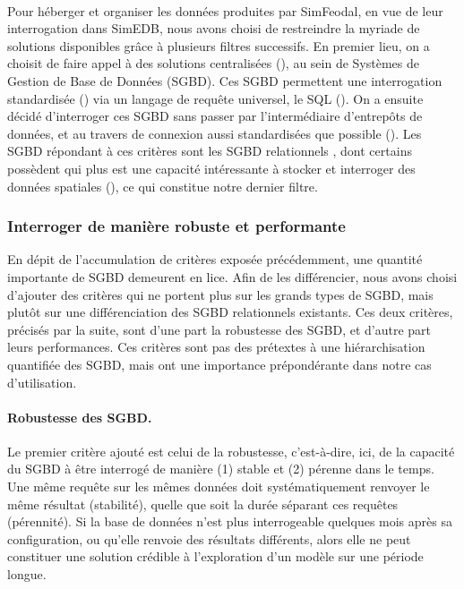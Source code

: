 \paragraph[Conclusion intermédiaire]{}

Pour héberger et organiser les données produites par SimFeodal, en vue de leur interrogation dans SimEDB, nous avons choisi de restreindre la myriade de solutions disponibles grâce à plusieurs filtres successifs.
En premier lieu, on a choisit de faire appel à des solutions centralisées (), au sein de Systèmes de Gestion de Base de Données (SGBD).
Ces SGBD permettent une interrogation standardisée () via un langage de requête universel, le SQL ().
On a ensuite décidé d'interroger ces SGBD sans passer par l'intermédiaire d'entrepôts de données, et au travers de connexion aussi standardisées que possible ().
Les SGBD répondant à ces critères sont les SGBD \og relationnels \fg{}, dont certains possèdent qui plus est une capacité intéressante à stocker et interroger des données spatiales (), ce qui constitue notre dernier filtre.

\subsubsection{Interroger de manière robuste et performante}\label{subsubsec:interroger-robuste-efficace}

En dépit de l'accumulation de critères exposée précédemment, une quantité importante de SGBD demeurent en lice.
Afin de les différencier, nous avons choisi d'ajouter des critères qui ne portent plus sur les grands types de SGBD, mais plutôt sur une différenciation des SGBD relationnels existants.
Ces deux critères, précisés par la suite, sont d'une part la robustesse des SGBD, et d'autre part leurs performances.
Ces critères sont pas des \og prétextes \fg{} à une hiérarchisation quantifiée des SGBD, mais ont une importance prépondérante dans notre cas d'utilisation.

\paragraph{Robustesse des SGBD.}
Le premier critère ajouté est celui de la robustesse, c'est-à-dire, ici, de la capacité du SGBD à être interrogé de manière (1) stable et  (2) pérenne dans le temps.
Une même requête sur les mêmes données doit systématiquement renvoyer le même résultat (stabilité), quelle que soit la durée séparant ces requêtes (pérennité).
Si la base de données n'est plus interrogeable quelques mois après sa configuration, ou qu'elle renvoie des résultats différents, alors elle ne peut constituer une solution crédible à l'exploration d'un modèle sur une période longue.

